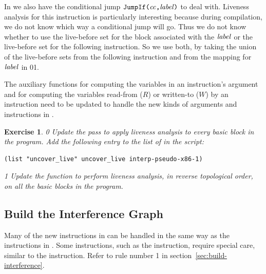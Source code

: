 \documentclass[7x10]{TimesAPriori_MIT}%
\def\racketEd{0}
\def\pythonEd{1}
\def\edition{1}
\newcommand{\racket}[1]{{\if\edition\racketEd{#1}\fi}}
\newcommand{\pythonColor}[0]{}
\newcommand{\python}[1]{{\if\edition\pythonEd\pythonColor #1\fi}}
\newtheorem{exercise}[theorem]{Exercise}
\numberwithin{theorem}{chapter}
\numberwithin{definition}{chapter}
\numberwithin{equation}{chapter}
\begin{document}
In \LangXIfVar{} we also have the conditional jump
$\texttt{JumpIf}\texttt{(} \mathit{cc} \texttt{,} \mathit{label} \texttt{)}$ to deal with.  Liveness analysis for
this instruction is particularly interesting because during
compilation, we do not know which way a conditional jump will go. Thus
we do not know whether to use the live-before set for the block
associated with the $\mathit{label}$ or the live-before set for the
following instruction. So we use both, by taking the union of the
live-before sets from the following instruction and from the mapping
for $\mathit{label}$ in
\racket{}\python{}.

The auxiliary functions for computing the variables in an
instruction's argument and for computing the variables read-from ($R$)
or written-to ($W$) by an instruction need to be updated to handle the
new kinds of arguments and instructions in \LangXIfVar{}.

\begin{exercise}\normalfont\normalsize
{\if\edition\racketEd
%
Update the  pass to apply liveness analysis to
every basic block in the program.
%
Add the following entry to the list of  in the
 script:
\begin{lstlisting}
(list "uncover_live" uncover_live interp-pseudo-x86-1)
\end{lstlisting}
\fi}

{\if\edition\pythonEd\pythonColor
%
Update the  function to perform liveness analysis,
in reverse topological order, on all the basic blocks in the
program.
%  
\fi}
\end{exercise}

\subsection{Build the Interference Graph}
\label{sec:build-interference-Lif}

Many of the new instructions in \LangXIfVar{} can be handled in the
same way as the instructions in \LangXVar{}.
%
Some instructions, such as the  instruction, require special care,
similar to the  instruction. Refer to rule number 1 in
section~\ref{sec:build-interference}.
\end{document}
